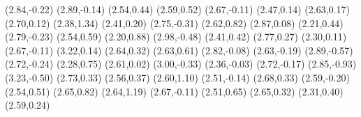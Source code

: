 \psdot[](2.84,-0.22)
\psdot[](2.89,-0.14)
\psdot[](2.54,0.44)
\psdot[](2.59,0.52)
\psdot[](2.67,-0.11)
\psdot[](2.47,0.14)
\psdot[](2.63,0.17)
\psdot[](2.70,0.12)
\psdot[](2.38,1.34)
\psdot[](2.41,0.20)
\psdot[](2.75,-0.31)
\psdot[](2.62,0.82)
\psdot[](2.87,0.08)
\psdot[](2.21,0.44)
\psdot[](2.79,-0.23)
\psdot[](2.54,0.59)
\psdot[](2.20,0.88)
\psdot[](2.98,-0.48)
\psdot[](2.41,0.42)
\psdot[](2.77,0.27)
\psdot[](2.30,0.11)
\psdot[](2.67,-0.11)
\psdot[](3.22,0.14)
\psdot[](2.64,0.32)
\psdot[](2.63,0.61)
\psdot[](2.82,-0.08)
\psdot[](2.63,-0.19)
\psdot[](2.89,-0.57)
\psdot[](2.72,-0.24)
\psdot[](2.28,0.75)
\psdot[](2.61,0.02)
\psdot[](3.00,-0.33)
\psdot[](2.36,-0.03)
\psdot[](2.72,-0.17)
\psdot[](2.85,-0.93)
\psdot[](3.23,-0.50)
\psdot[](2.73,0.33)
\psdot[](2.56,0.37)
\psdot[](2.60,1.10)
\psdot[](2.51,-0.14)
\psdot[](2.68,0.33)
\psdot[](2.59,-0.20)
\psdot[](2.54,0.51)
\psdot[](2.65,0.82)
\psdot[](2.64,1.19)
\psdot[](2.67,-0.11)
\psdot[](2.51,0.65)
\psdot[](2.65,0.32)
\psdot[](2.31,0.40)
\psdot[](2.59,0.24)
